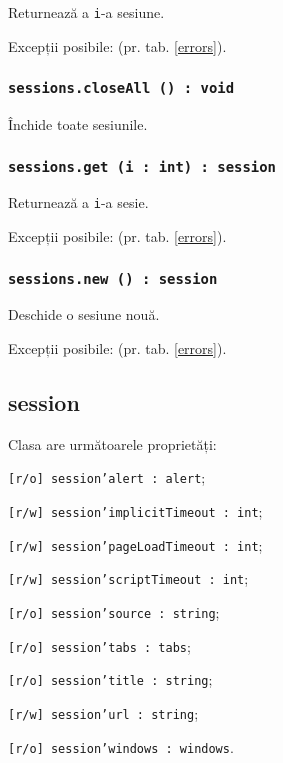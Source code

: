 Returnează a \texttt{i}-a sesiune.

Excepții posibile:  (pr. tab. \ref{errors}).

\subsubsection{\texttt{sessions.closeAll () : void}}

Închide toate sesiunile.

\subsubsection{\texttt{sessions.get (i : int) : session}}

Returnează a \texttt{i}-a sesie.

Excepții posibile:  (pr. tab. \ref{errors}).

\subsubsection{\texttt{sessions.new () : session}}

Deschide o sesiune nouă.

Excepții posibile:  (pr. tab. \ref{errors}).

\subsection{session}

Clasa \session{} are următoarele proprietăți:
\begin{icItems}
	\item \texttt{[r/o] session'alert : alert};
	\item \texttt{[r/w] session'implicitTimeout : int};
	\item \texttt{[r/w] session'pageLoadTimeout : int};
	\item \texttt{[r/w] session'scriptTimeout : int};
	\item \texttt{[r/o] session'source : string};
	\item \texttt{[r/o] session'tabs : tabs};
	\item \texttt{[r/o] session'title : string};
	\item \texttt{[r/w] session'url : string};
	\item \texttt{[r/o] session'windows : windows}.
\end{icItems}

